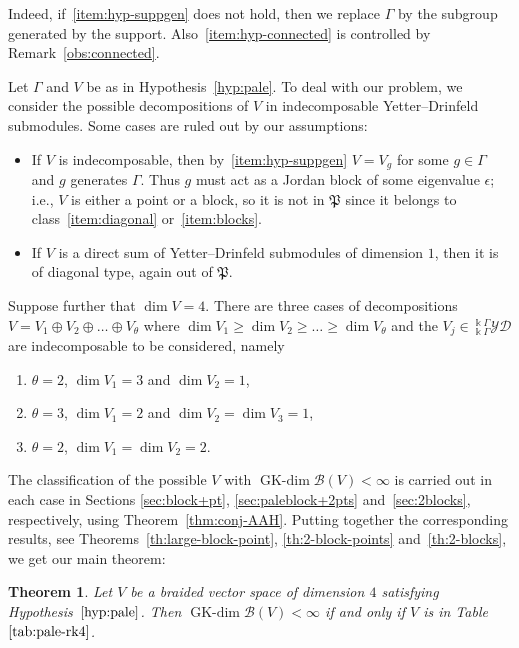 \documentclass[10pt,a4paper]{amsart}
\numberwithin{equation}{section}
\newtheorem{Theorem}{Theorem}[section]
\newcommand{\GK}{\operatorname{GK-dim}}
\newcommand{\toba}{\mathscr B}
\newcommand{\pale}{\mathfrak{P}}
\newcommand{\yd}[1]{{}_{#1}^{#1}\mathcal{YD}}
\begin{document}
Indeed, if~\ref{item:hyp-suppgen} does not hold, then
we replace $\Gamma$ by the subgroup generated by the support.
Also~\ref{item:hyp-connected} is controlled by Remark~\ref{obs:connected}.

Let $\Gamma$ and $V$ be as in
Hypothesis~\ref{hyp:pale}. To deal with our problem,
we consider the possible decompositions of $V$ in indecomposable Yetter--Drinfeld submodules.
Some cases are ruled out by our assumptions:
\begin{itemize}\itemsep=0pt
\item If $V$ is indecomposable, then by~\ref{item:hyp-suppgen} $V=V_g$ for some $g \in \Gamma$ and $g$ generates $\Gamma$.
Thus $g$ must act as a Jordan block of some eigenvalue $\epsilon$; i.e., $V$ is either a point or a block,
so it is not in $\pale$ since it belongs to class~\ref{item:diagonal} or~\ref{item:blocks}.

\item If $V$ is a direct sum of Yetter--Drinfeld submodules of dimension $1$, then it is of diagonal type, again out of $\pale$.
\end{itemize}

Suppose further that
$\dim V = 4$. There are three cases of decompositions
$V = V_1 \oplus V_2 \oplus \dots \oplus V_{\theta}$
where $\dim V_1 \geq \dim V_2 \geq \dots \geq \dim V_{\theta}$ and the $V_j\in \yd{\Bbbk\Gamma}$ are indecomposable to be considered,
namely
\begin{enumerate}[label=$(\arabic*)$]\itemsep=0pt
\item $\theta = 2$, $\dim V_1 = 3$ and $\dim V_2 = 1$,

\item $\theta = 3$, $\dim V_1 = 2$ and $\dim V_2 = \dim V_3 = 1$,

\item $\theta = 2$, $\dim V_1 = \dim V_2 = 2$.
\end{enumerate}


The classification of the possible $V$ with $\GK \toba(V) < \infty$ is carried out in each case in Sections
\ref{sec:block+pt}, \ref{sec:paleblock+2pts} and~\ref{sec:2blocks}, respectively, using Theorem~\ref{thm:conj-AAH}.
Putting together
the corresponding results, see Theorems~\ref{th:large-block-point}, \ref{th:2-block-points} and~\ref{th:2-blocks},
we get our main theorem:


\begin{Theorem}\label{th:paleblock-dim4}
Let $V$ be a braided vector space of dimension $4$ satisfying Hypothesis~$\ref{hyp:pale}$.
Then $\GK \toba(V) < \infty$ if and only if $V$ is in Table~$\ref{tab:pale-rk4}$.
\end{Theorem}
\end{document}
